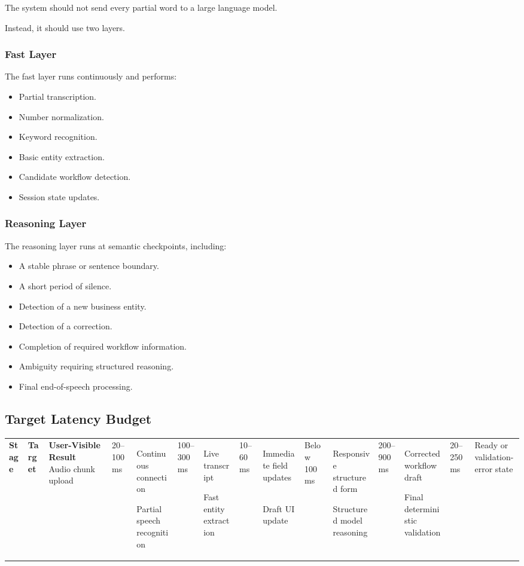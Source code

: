 \documentclass[11pt,a4paper]{article}
\begin{document}
The system should not send every partial word to a large language model.

Instead, it should use two layers.

\subsubsection{Fast Layer}

The fast layer runs continuously and performs:

\begin{itemize}
\item Partial transcription.
\item Number normalization.
\item Keyword recognition.
\item Basic entity extraction.
\item Candidate workflow detection.
\item Session state updates.
\end{itemize}

\subsubsection{Reasoning Layer}

The reasoning layer runs at semantic checkpoints, including:

\begin{itemize}
\item A stable phrase or sentence boundary.
\item A short period of silence.
\item Detection of a new business entity.
\item Detection of a correction.
\item Completion of required workflow information.
\item Ambiguity requiring structured reasoning.
\item Final end-of-speech processing.
\end{itemize}

\subsection{Target Latency Budget}

\begin{tabularx}{\textwidth}{Y L{34mm} Y}
\toprule
\textbf{Stage} & \textbf{Target} & \textbf{User-Visible Result} \
\midrule
Audio chunk upload
& 20--100 ms
& Continuous connection \

Partial speech recognition
& 100--300 ms
& Live transcript \

Fast entity extraction
& 10--60 ms
& Immediate field updates \

Draft UI update
& Below 100 ms
& Responsive structured form \

Structured model reasoning
& 200--900 ms
& Corrected workflow draft \

Final deterministic validation
& 20--250 ms
& Ready or validation-error state \
\bottomrule
\end{tabularx}
\end{document}

